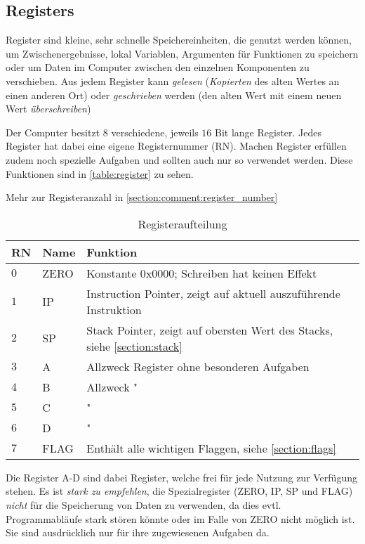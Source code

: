 \documentclass{scrartcl}
\begin{document}
\subsection{Registers}
Register sind kleine, sehr schnelle Speichereinheiten, die genutzt werden können, um Zwischenergebnisse, lokal Variablen, Argumenten für Funktionen zu speichern oder um Daten im Computer zwischen den einzelnen Komponenten zu verschieben. Aus jedem Register kann \emph{gelesen} (\emph{Kopierten} des alten Wertes an einen anderen Ort) oder \emph{geschrieben} werden (den alten Wert mit einem neuen Wert \emph{überschreiben})

Der Computer besitzt $8$ verschiedene, jeweils $16$ Bit lange Register. Jedes Register hat dabei eine eigene Registernummer (RN). Machen Register erfüllen zudem noch spezielle Aufgaben und sollten auch nur so verwendet werden. Diese Funktionen sind in \autoref{table:register} zu sehen.

Mehr zur Registeranzahl in \autoref{section:comment:register_number}

\begin{center}
	\begin{table}[h]
		\caption{\label{table:register} Registeraufteilung}
		\begin{tabular}{l | l | l}
			RN & Name & Funktion\\
			\hline
			$0$ & ZERO & Konstante $0\text{x}0000$; Schreiben hat keinen Effekt\\
			$1$ & IP & Instruction Pointer, zeigt auf aktuell auszuführende Instruktion\\
			$2$ & SP & Stack Pointer, zeigt auf obersten Wert des Stacks, siehe \ref{section:stack} \\
			$3$ & A & Allzweck Register ohne besonderen Aufgaben \\
			$4$ & B & Allzweck " \\
			$5$ & C & " \\
			$6$ & D & " \\
			$7$ & FLAG & Enthält alle wichtigen Flaggen, siehe \autoref{section:flags} \\
		\end{tabular}
	\end{table}
\end{center}

Die Register A-D sind dabei Register, welche frei für jede Nutzung zur Verfügung stehen. Es ist \emph{stark zu empfehlen}, die Spezialregister (ZERO, IP, SP und FLAG) \emph{nicht} für die Speicherung von Daten zu verwenden, da dies evtl. Programmabläufe stark stören könnte oder im Falle von ZERO nicht möglich ist. Sie sind ausdrücklich nur für ihre zugewiesenen Aufgaben da.
\end{document}
